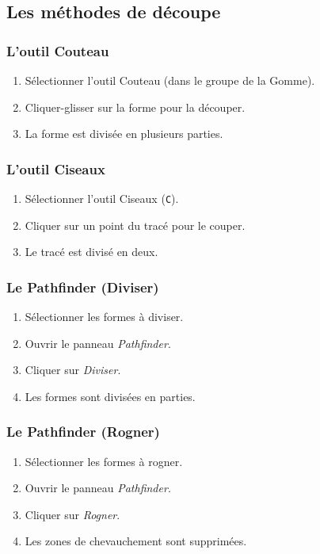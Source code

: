 \subsection{Les méthodes de découpe}

\subsubsection{L'outil Couteau}

\begin{enumerate}
    \item Sélectionner l'outil Couteau (dans le groupe de la Gomme).
    \item Cliquer-glisser sur la forme pour la découper.
    \item La forme est divisée en plusieurs parties.
\end{enumerate}

\subsubsection{L'outil Ciseaux}

\begin{enumerate}
    \item Sélectionner l'outil Ciseaux (\texttt{C}).
    \item Cliquer sur un point du tracé pour le couper.
    \item Le tracé est divisé en deux.
\end{enumerate}

\subsubsection{Le Pathfinder (Diviser)}

\begin{enumerate}
    \item Sélectionner les formes à diviser.
    \item Ouvrir le panneau \emph{Pathfinder}.
    \item Cliquer sur \emph{Diviser}.
    \item Les formes sont divisées en parties.
\end{enumerate}

\subsubsection{Le Pathfinder (Rogner)}

\begin{enumerate}
    \item Sélectionner les formes à rogner.
    \item Ouvrir le panneau \emph{Pathfinder}.
    \item Cliquer sur \emph{Rogner}.
    \item Les zones de chevauchement sont supprimées.
\end{enumerate}

